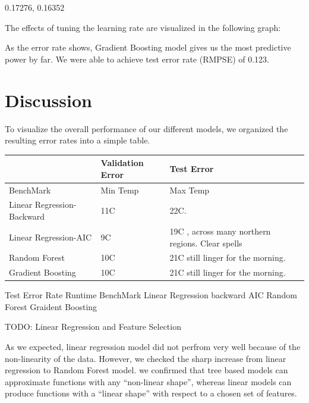 \documentclass[letterpaper,twocolumn,10pt]{article}
\begin{document}
0.17276, 0.16352

The effects of tuning the learning rate are visualized in the following graph:


As the error rate shows, Gradient Boosting model gives us the most predictive power by far. We were able to achieve test error rate (RMPSE) of 0.123.



\section{Discussion}
To visualize the overall performance of our different models, we organized the resulting error rates into a simple table. 

\begin{center}
    \begin{tabular}{| l | l | l |}
      \hline
      & Validation Error & Test Error \\ \hline
    BenchMark & Min Temp & Max Temp \\ \hline
    Linear Regression-Backward & 11C & 22C. \\ \hline
    Linear Regression-AIC & 9C & 19C , across many northern regions. Clear spells \\ \hline
    Random Forest & 10C & 21C  still linger for the morning.  \\ \hline
    Gradient Boosting & 10C & 21C  still linger for the morning.  \\
    \hline    
    \end{tabular}
\end{center}

                    Test Error Rate    Runtime
BenchMark
Linear Regression
  backward
  AIC
Random Forest
Graident Boosting

TODO: Linear Regression and Feature Selection 


As we expected, linear regression model did not perfrom very well because of the non-linearity of the data. However, we checked the sharp increase from linear regression to Random Forest model. we confirmed that tree based models can approximate functions with any ``non-linear shape'', whereas linear models can produce functions with a ``linear shape'' with respect to a chosen set of features. 
\end{document}
